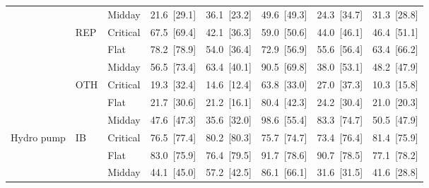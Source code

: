 \begin{tabular}{l l l r r r r r}
 &  & Midday & 21.6~{\color{seasoncol}\scriptsize[29.1]} & 36.1~{\color{seasoncol}\scriptsize[23.2]} & 49.6~{\color{seasoncol}\scriptsize[49.3]} & 24.3~{\color{seasoncol}\scriptsize[34.7]} & 31.3~{\color{seasoncol}\scriptsize[28.8]} \\
 & REP & Critical & 67.5~{\color{seasoncol}\scriptsize[69.4]} & 42.1~{\color{seasoncol}\scriptsize[36.3]} & 59.0~{\color{seasoncol}\scriptsize[50.6]} & 44.0~{\color{seasoncol}\scriptsize[46.1]} & 46.4~{\color{seasoncol}\scriptsize[51.1]} \\
 &  & Flat & 78.2~{\color{seasoncol}\scriptsize[78.9]} & 54.0~{\color{seasoncol}\scriptsize[36.4]} & 72.9~{\color{seasoncol}\scriptsize[56.9]} & 55.6~{\color{seasoncol}\scriptsize[56.4]} & 63.4~{\color{seasoncol}\scriptsize[66.2]} \\
 &  & Midday & 56.5~{\color{seasoncol}\scriptsize[73.4]} & 63.4~{\color{seasoncol}\scriptsize[40.1]} & 90.5~{\color{seasoncol}\scriptsize[69.8]} & 38.0~{\color{seasoncol}\scriptsize[53.1]} & 48.2~{\color{seasoncol}\scriptsize[47.9]} \\
 & OTH & Critical & 19.3~{\color{seasoncol}\scriptsize[32.4]} & 14.6~{\color{seasoncol}\scriptsize[12.4]} & 63.8~{\color{seasoncol}\scriptsize[33.0]} & 27.0~{\color{seasoncol}\scriptsize[37.3]} & 10.3~{\color{seasoncol}\scriptsize[15.8]} \\
 &  & Flat & 21.7~{\color{seasoncol}\scriptsize[30.6]} & 21.2~{\color{seasoncol}\scriptsize[16.1]} & 80.4~{\color{seasoncol}\scriptsize[42.3]} & 24.2~{\color{seasoncol}\scriptsize[30.4]} & 21.0~{\color{seasoncol}\scriptsize[20.3]} \\
 &  & Midday & 47.6~{\color{seasoncol}\scriptsize[47.3]} & 35.6~{\color{seasoncol}\scriptsize[32.0]} & 98.6~{\color{seasoncol}\scriptsize[55.4]} & 83.3~{\color{seasoncol}\scriptsize[74.7]} & 50.5~{\color{seasoncol}\scriptsize[47.9]} \\
\addlinespace
Hydro pump & IB & Critical & 76.5~{\color{seasoncol}\scriptsize[77.4]} & 80.2~{\color{seasoncol}\scriptsize[80.3]} & 75.7~{\color{seasoncol}\scriptsize[74.7]} & 73.4~{\color{seasoncol}\scriptsize[76.4]} & 81.4~{\color{seasoncol}\scriptsize[75.9]} \\
 &  & Flat & 83.0~{\color{seasoncol}\scriptsize[75.9]} & 76.4~{\color{seasoncol}\scriptsize[79.5]} & 91.7~{\color{seasoncol}\scriptsize[78.6]} & 90.7~{\color{seasoncol}\scriptsize[78.5]} & 77.1~{\color{seasoncol}\scriptsize[78.2]} \\
 &  & Midday & 44.1~{\color{seasoncol}\scriptsize[45.0]} & 57.2~{\color{seasoncol}\scriptsize[42.5]} & 86.1~{\color{seasoncol}\scriptsize[66.1]} & 31.6~{\color{seasoncol}\scriptsize[31.5]} & 41.6~{\color{seasoncol}\scriptsize[28.8]} \\

\end{tabular}
